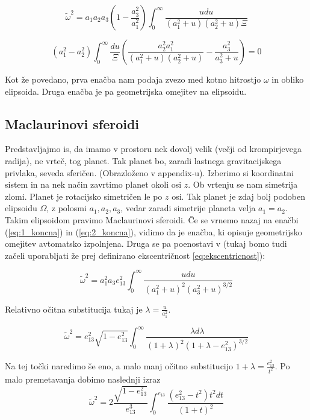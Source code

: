 \documentclass{article}
\theoremstyle{definition}
\theoremstyle{plain}
\numberwithin{definition}{section}
\numberwithin{theorem}{section}
\begin{document}
\begin{equation}
	\tilde{\omega}^2 = 
	a_1 a_2 a_3 \left(1-\frac{a_3^2}{a_1^2}\right) \int_0^{\infty} 
	\frac{u du}{(a_1^2 + u)(a_2^2 + u)\Xi}
\end{equation}

\begin{equation}
	(a_1^2 - a_2^2) \int_0^{\infty} \frac{du}{\Xi}
	\left( \frac{a_2^2 a_1^2}{(a_1^2 + u)(a_2^2 + u)} - 
	\frac{a_3^2}{a_3^2 + u} \right) = 0
\end{equation}

Kot že povedano, prva enačba nam podaja zvezo med kotno hitrostjo $\omega$
in obliko elipsoida. Druga enačba je pa geometrijska omejitev na elipsoidu.

\subsection{Maclaurinovi sferoidi}
Predstavljajmo is, da imamo v prostoru nek dovolj velik 
(večji od krompirjevega radija), ne vrteč, tog planet. Tak planet bo, zaradi 
lastnega gravitacijskega privlaka, seveda sferičen. 
(Obrazloženo v appendix-u).
Izberimo si koordinatni sistem in na nek način zavrtimo planet okoli osi $z$.
Ob vrtenju se nam simetrija zlomi. Planet je rotacijsko simetričen le po $z$
osi. Tak planet je zdaj bolj podoben elipsoidu $\Omega$, z polosmi 
$a_1, a_2, a_3$, vedar zaradi simetrije planeta velja $a_1 = a_2$. Takim
elipsoidom pravimo Maclaurinovi sferoidi. 
Če se vrnemo nazaj na enačbi (\ref{eq:1_koncna}) in (\ref{eq:2_koncna}),
vidimo da je enačba, ki opisuje geometrijsko omejitev avtomatsko izpolnjena.
Druga se pa poenostavi v 
(tukaj bomo tudi začeli uporabljati že prej definirano ekscentričnost
\ref{eq:ekscentricnost}):

\begin{equation}
	\tilde{\omega}^2 = a_1^2 a_3 e_{13}^2
	\int_0^{\infty} \frac{udu}{(a_1^2+u)^2(a_3^2+u)^{3/2}}
	\label{eq:mc_zveza}
\end{equation}

Relativno očitna substitucija tukaj je $\lambda = \frac{u}{a_1^2}$.

\begin{equation}	
	\tilde{\omega}^2 = e_{13}^2 \sqrt{1 - e_{13}^2} 
	\int_0^{\infty} 
	\frac{\lambda d \lambda}{(1+\lambda)^2(1 + \lambda - e_{13}^2)^{3/2}}
	\label{eq:mc_zveza_sub}
\end{equation}

Na tej točki naredimo še eno, a malo manj očitno substitucijo 
$1 + \lambda = \frac{e_{13}^2}{t^2}$. 
Po malo premetavanja dobimo naslednji izraz
\begin{equation}	
	\tilde{\omega}^2 = 2\frac{\sqrt{1 - e_{13}^2}}{e_{13}^3}
	\int_0^{e_{13}} 
	\frac{(e_{13}^2 - t^2) t^2 dt}{(1 + t)^2}
	\label{eq:mc_zveza_sub_2}
\end{equation}
\end{document}
